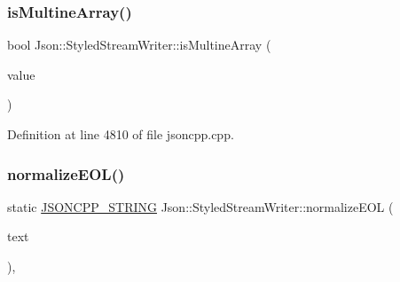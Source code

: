 \subsubsection{\texorpdfstring{is\+Multine\+Array()}{isMultineArray()}\hspace{0.1cm}{\footnotesize\ttfamily [2/2]}}
{\footnotesize\ttfamily bool Json\+::\+Styled\+Stream\+Writer\+::is\+Multine\+Array (\begin{DoxyParamCaption}\item[{const \hyperlink{class_json_1_1_value}{Value} \&}]{value }\end{DoxyParamCaption})\hspace{0.3cm}{\ttfamily [private]}}



Definition at line 4810 of file jsoncpp.\+cpp.

\hypertarget{class_json_1_1_styled_stream_writer_ae481322d7a439881b257ba7aeda6d19b}{}\label{class_json_1_1_styled_stream_writer_ae481322d7a439881b257ba7aeda6d19b} 
\subsubsection{\texorpdfstring{normalize\+E\+O\+L()}{normalizeEOL()}\hspace{0.1cm}{\footnotesize\ttfamily [1/2]}}
{\footnotesize\ttfamily static \hyperlink{config_8h_a1e723f95759de062585bc4a8fd3fa4be}{J\+S\+O\+N\+C\+P\+P\+\_\+\+S\+T\+R\+I\+NG} Json\+::\+Styled\+Stream\+Writer\+::normalize\+E\+OL (\begin{DoxyParamCaption}\item[{const \hyperlink{config_8h_a1e723f95759de062585bc4a8fd3fa4be}{J\+S\+O\+N\+C\+P\+P\+\_\+\+S\+T\+R\+I\+NG} \&}]{text }\end{DoxyParamCaption})\hspace{0.3cm}{\ttfamily [static]}, {\ttfamily [private]}}

\hypertarget{class_json_1_1_styled_stream_writer_ae481322d7a439881b257ba7aeda6d19b}{}\label{class_json_1_1_styled_stream_writer_ae481322d7a439881b257ba7aeda6d19b} 
